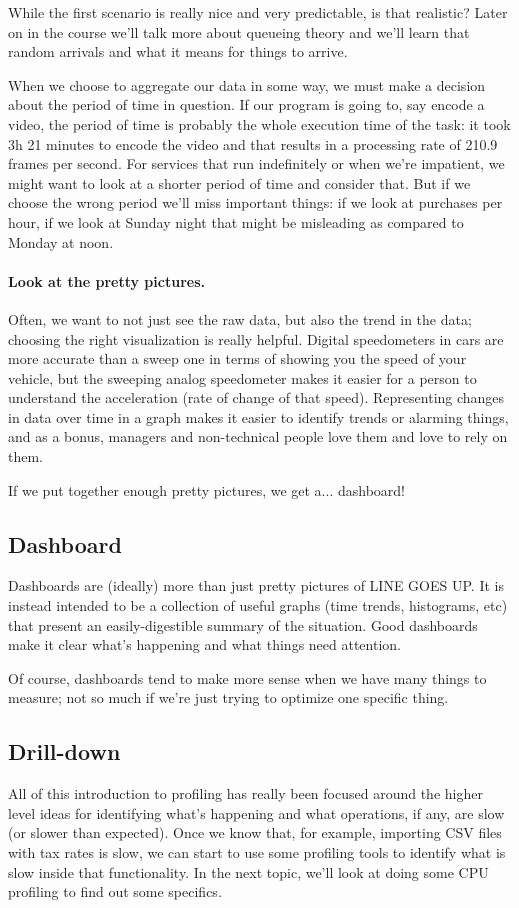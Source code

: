 While the first scenario is really nice and very predictable, is that realistic? Later on in the course we'll talk more about queueing theory and we'll learn that random arrivals and what it means for things to arrive.

When we choose to aggregate our data in some way, we must make a decision about the period of time in question. If our program is going to, say encode a video, the period of time is probably the whole execution time of the task: it took 3h 21 minutes to encode the video and that results in a processing rate of 210.9 frames per second. For services that run indefinitely or when we're impatient, we might want to look at a shorter period of time and consider that. But if we choose the wrong period we'll miss important things: if we look at purchases per hour, if we look at Sunday night that might be misleading as compared to Monday at noon.

\paragraph{Look at the pretty pictures.} 
Often, we want to not just see the raw data, but also the trend in the data; choosing the right visualization is really helpful. Digital speedometers in cars are more accurate than a sweep one in terms of showing you the speed of your vehicle, but the sweeping analog speedometer makes it easier for a person to understand the acceleration (rate of change of that speed). Representing changes in data over time in a graph makes it easier to identify trends or alarming things, and as a bonus, managers and non-technical people love them and love to rely on them.

If we put together enough pretty pictures, we get a... dashboard!

\subsection*{Dashboard}

Dashboards are (ideally) more than just pretty pictures of LINE GOES UP. It is instead intended to be a collection of useful graphs (time trends, histograms, etc) that present an easily-digestible summary of the situation. Good dashboards make it clear what's happening and what things need attention. 

Of course, dashboards tend to make more sense when we have many things to measure; not so much if we're just trying to optimize one specific thing.

\subsection*{Drill-down}
All of this introduction to profiling has really been focused around the higher level ideas for identifying what's happening and what operations, if any, are slow (or slower than expected). Once we know that, for example, importing CSV files with tax rates is slow, we can start to use some profiling tools to identify what is slow inside that functionality. In the next topic, we'll look at doing some CPU profiling to find out some specifics.




